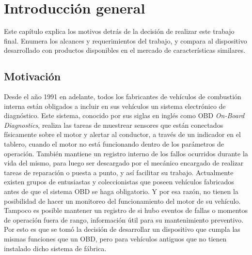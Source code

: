 \chapter{Introducción general} %

Este capítulo explica los motivos detrás de la decisión de realizar este trabajo final. 
Enumera los alcances y requerimientos del trabajo, y compara al dispositivo desarrollado con productos disponibles en el mercado de características similares.

\label{Chapter1} %
\label{IntroGeneral}


\newcommand{\keyword}[1]{\textbf{#1}}
\newcommand{\tabhead}[1]{\textbf{#1}}
\newcommand{\code}[1]{\texttt{#1}}
\newcommand{\file}[1]{\texttt{\bfseries#1}}
\newcommand{\option}[1]{\texttt{\itshape#1}}
\newcommand{\grados}{$^{\circ}$}



\section{Motivación}

Desde el año 1991 en adelante, todos los fabricantes de vehículos de combustión interna están obligados a incluir en sus vehículos un sistema electrónico de diagnóstico. Este sistema, conocido por sus siglas en inglés como OBD \textit{On-Board Diagnostics}, realiza las tareas de muestrear sensores que están conectados físicamente sobre el motor y alertar al conductor, a través de un indicador en el tablero, cuando el motor no está funcionando dentro de los parámetros de operación. También mantiene un registro interno de los fallos ocurridos durante la vida del mismo, para luego ser descargado por el mecánico encargado de realizar tareas de reparación o puesta a punto, y así facilitar su trabajo.
Actualmente existen grupos de entusiastas y coleccionistas que poseen vehículos fabricados antes de que el sistema OBD se haga obligatorio. Y por esa razón, no tienen la posibilidad de hacer un monitoreo del funcionamiento del motor de su vehículo. Tampoco es posible mantener un registro de si hubo eventos de fallas o momentos de operación fuera de rango, información útil para su mantenimiento preventivo.
Por esto es que se tomó la decisión de desarrollar un dispositivo que cumpla las mismas funciones que un OBD, pero para vehículos antiguos que no tienen instalado dicho sistema de fábrica.


